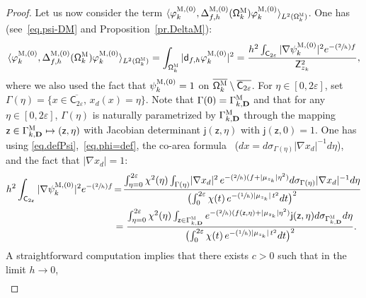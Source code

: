 \documentclass[10pt]{amsart}
\newcommand{\Psfrac}[2]{(\sfrac{#1}{#2})}
\newcommand\mto{\mathchoice{\longmapsto}{\mapsto}{\mapsto}{\mapsto}}
\newcommand{\mbf}[1]{\mathbf{#1}}
\let\ve\varepsilon
\theoremstyle{plain}
\theoremstyle{definition}
\begin{document}
\begin{proof}
Let us now consider the term $\langle \varphi^{\textsc{M},(0)}_k,\Delta_{f,h}^{\textsc{M}, (0)}(\mathsf \Omega_k^{\textsc{M}}) \varphi^{\textsc{M},(0)}_k \rangle_{L^2(\mathsf \Omega_k^{\textsc{M}})}$. One has (see~\eqref{eq.psi-DM} and Proposition~\ref{pr.DeltaM}):
\begin{align*}
\langle \varphi^{\textsc{M},(0)}_k,\Delta_{f,h}^{\textsc{M}, (0)}(\mathsf \Omega_k^{\textsc{M}}) \varphi^{\textsc{M},(0)}_k \rangle_{L^2(\mathsf \Omega_k^{\textsc{M}})}= \int_{\mathsf \Omega_k^{\textsc{M}}} \vert \mathsf d_{f,h} \varphi^{\textsc{M},(0)}_k \vert^2 = \frac{h^2 \int_{\mathsf C_{2\ve}} \vert \nabla \psi^{\textsc{M},(0)}_k \vert^2 e^{-\Psfrac 2h f} }{\mathsf Z_{z_k}^2},
\end{align*}
where we also used the fact that $\psi^{\textsc{M},(0)}_k=1$ on $
\overline{\mathsf \Omega_k^{\textsc{M}} }\setminus \overline{\mathsf
C_{2\ve}}$. For $\eta\in [0,2\ve]$, set $ \Gamma (\eta)=\{ x
\in\overline{ \mathsf C_{2\ve}},\, x_d(x)=\eta\}$. Note that $ \Gamma
(0)=\Gamma^{\textsc{M}}_{k,\mbf D}$ and that for any $\eta\in
[0,2\ve]$, $\Gamma (\eta)$ is naturally parametrized by
$\Gamma^{\textsc{M}}_{k,\mbf D}$ through the mapping $\mathsf z\in
\Gamma^{\textsc{M}}_{k,\mbf D}\mto (\mathsf z,\eta)$ with Jacobian
determinant $\mathsf j(\mathsf z,\eta)$ with $\mathsf j(\mathsf
z,0)=1$. One has using \eqref{eq.defPsi},~\eqref{eq.phi=def}, the co-area formula~\cite{evans-gariepy-18} ($dx=d\sigma_{\Gamma (\eta)} |\nabla x_d|^{-1} d\eta$), and the fact that
$\vert \nabla x_d\vert=1$:\vspace*{-3pt}
\begin{align*}
{h^2 \int_{\mathsf C_{2\ve}} \vert\nabla \psi^{\textsc{M},(0)}_k \vert^2 e^{-\Psfrac 2h f} } &\!=\! \frac{ \int_{\eta=0}^{2\ve} \chi^2(\eta) \int_{\Gamma (\eta) } \! |\nabla x_d|^2 \, e^{-\Psfrac 2h (f +\vert \mu_{z_k}\vert \eta^2)} d\sigma _{\Gamma (\eta)} |\nabla x_d|^{-1} d\eta }{ \bigl(\int_0^{2\ve}\chi(t)\, e^{-\Psfrac 1h\vert \mu_{z_k}\vert \, t^2} dt\bigr)^2 }\\
&=\frac{ \int_{\eta=0}^{2\ve} \chi^2(\eta) \int_{\mathsf z \in \Gamma_{k,\mbf D}^{\textsc{M}} } e^{-\Psfrac 2h (f(\mathsf z,\eta) +\vert \mu_{z_k}\vert \eta^2)} \mathsf j(\mathsf z,\eta) d\sigma _{\Gamma^{\textsc{M}}_{k,\mbf D}} d\eta }{ \bigl(\int_0^{2\ve}\chi(t)\, e^{-\Psfrac 1h\vert \mu_{z_k}\vert \, t^2} dt\bigr)^2 }.
\end{align*}
A straightforward computation implies that there exists $c>0$ such that in
the limit $h\to 0$,\vspace*{-3pt}
\begin{align}\label{eq.chiUU2}

\end{align}
\end{proof}
\end{document}
